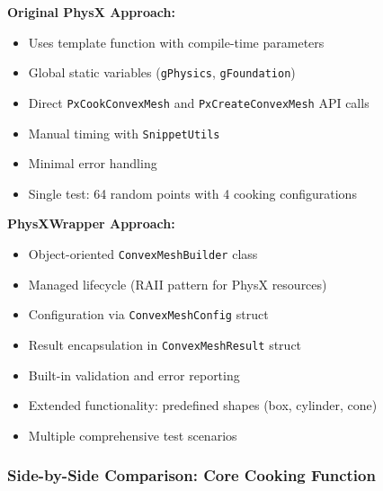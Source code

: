 \textbf{Original PhysX Approach:}
\begin{itemize}
    \item Uses template function with compile-time parameters
    \item Global static variables (\texttt{gPhysics}, \texttt{gFoundation})
    \item Direct \texttt{PxCookConvexMesh} and \texttt{PxCreateConvexMesh} API calls
    \item Manual timing with \texttt{SnippetUtils}
    \item Minimal error handling
    \item Single test: 64 random points with 4 cooking configurations
\end{itemize}

\textbf{PhysXWrapper Approach:}
\begin{itemize}
    \item Object-oriented \texttt{ConvexMeshBuilder} class
    \item Managed lifecycle (RAII pattern for PhysX resources)
    \item Configuration via \texttt{ConvexMeshConfig} struct
    \item Result encapsulation in \texttt{ConvexMeshResult} struct
    \item Built-in validation and error reporting
    \item Extended functionality: predefined shapes (box, cylinder, cone)
    \item Multiple comprehensive test scenarios
\end{itemize}

\subsubsection{Side-by-Side Comparison: Core Cooking Function}

